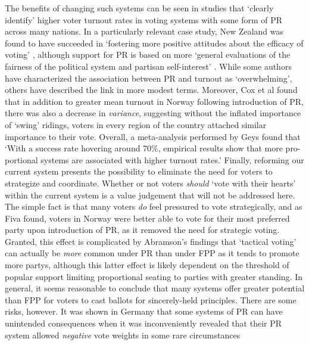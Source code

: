 

The benefits of changing such systems can be seen in studies that `clearly identify' higher voter turnout rates in voting systems with some form of PR\cite{Blais_1990} across many nations.
In a particularly relevant case study, New Zealand was found to have succeeded in `fostering more positive attitudes about the efficacy of voting' \cite{Karp_Banducci}, although support for PR is based on more `general evaluations of the fairness of the political system and partisan self-interest' \cite{Banducci_Karp}.
While some authors have characterized the association between PR and turnout as `overwhelming'\cite{Selb}, others have described the link in more modest terms.
Moreover, Cox et al found that in addition to greater mean turnout in Norway following introduction of PR, there was also a decrease in \emph{variance}, suggesting without the inflated importance of `swing' ridings, voters in every region of the country attached similar importance to their vote\cite{Cox}.
Overall, a meta-analysis performed by Geys\cite{Geys_2006} found that `With a success rate hovering around 70\%, empirical results show that more pro-portional systems are associated with higher turnout rates.'
Finally, reforming our current system presents the possibility to eliminate the need for voters to strategize and coordinate. Whether or not voters \emph{should} `vote with their hearts' within the current system is a value judgement that will not be addressed here. The simple fact is that many voters \emph{do} feel pressured to vote strategically, and as Fiva found, voters in Norway were better able to vote for their most preferred party upon introduction of PR, as it removed the need for strategic voting\cite{Fiva}.
Granted, this effect is complicated by Abramson's findings that `tactical voting' can actually be \emph{more} common under PR than under FPP as it tends to promote more partys\cite{Abramson_2010}, although this latter effect is likely dependent on the threshold of popular support limiting proportional seating to parties with greater standing.
In general, it seems reasonable to conclude that many systems offer greater potential than FPP for voters to cast ballots for sincerely-held principles.
There are some risks, however. It was shown in Germany that some systems of PR can have unintended consequences when it was inconveniently revealed that their PR system allowed \emph{negative} vote weights in some rare circumstances\cite{Die_Zeit_negative_vote}
